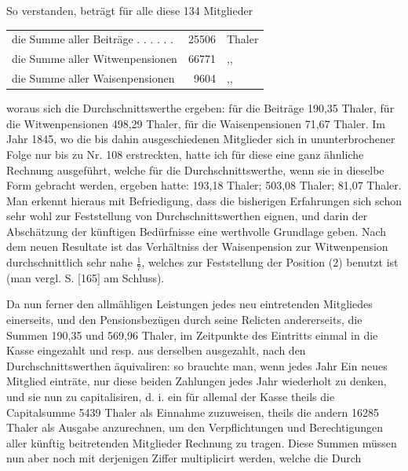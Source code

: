 So verstanden, beträgt für alle diese 134 Mitglieder
\begin{center}
\begin{tabular}{l r l}
die Summe aller Beiträge . . . . . .&25506&Thaler\\
die Summe aller Witwenpensionen&66771&,,\\
die Summe aller Waisenpensionen&9604&,,
\end{tabular}
\end{center}
\noindent woraus sich die Durchschnittswerthe ergeben: für die Beiträge 190,35 Thaler, für die Witwenpensionen 498,29 Thaler, für die Waisenpensionen 71,67 Thaler. Im Jahr 1845, wo die bis dahin ausgeschiedenen Mitglieder sich in ununterbrochener Folge nur bis zu Nr. 108 erstreckten, hatte ich für diese eine ganz ähnliche Rechnung ausgeführt, welche für die Durchschnittswerthe, wenn sie in dieselbe Form gebracht werden, ergeben hatte: 193,18 Thaler; 503,08 Thaler; 81,07 Thaler. Man erkennt hieraus mit Befriedigung, dass die bisherigen Erfahrungen sich schon sehr wohl zur Feststellung von Durchschnittswerthen eignen, und darin der Abschätzung der künftigen Bedürfnisse eine werthvolle Grundlage geben. Nach dem neuen Resultate ist das Verhältniss der Waisenpension zur Witwenpension durchschnittlich sehr nahe \(\tfrac{1}{7}\), welches zur Feststellung der Position (2) benutzt ist (man vergl. S. [165] am Schluss).

Da nun ferner den allmähligen Leistungen jedes neu eintretenden Mitgliedes einerseits, und den Pensionsbezügen durch seine Relicten andererseits, die Summen 190,35 und 569,96 Thaler, im Zeitpunkte des Eintritts einmal in die Kasse eingezahlt und resp. aus derselben ausgezahlt, nach den Durchschnittswerthen äquivaliren: so brauchte man, wenn jedes Jahr Ein neues Mitglied einträte, nur diese beiden Zahlungen jedes Jahr wiederholt zu denken, und sie nun zu capitalisiren, d. i. ein für allemal der Kasse theils die Capitalsumme 5439 Thaler als Einnahme zuzuweisen, theils die andern 16285 Thaler als Ausgabe anzurechnen, um den Verpflichtungen und Berechtigungen aller künftig beitretenden Mitglieder Rechnung zu tragen. Diese Summen müssen nun aber noch mit derjenigen Ziffer multiplicirt werden, welche die Durch%
